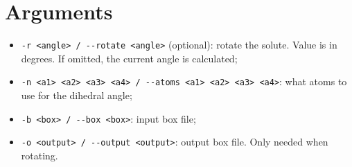 \section{Arguments}
\begin{itemize}
	\item \verb|-r <angle> / --rotate <angle>| (optional): rotate the solute. 
	Value is in degrees. If omitted, the current angle is calculated;
	\item \verb|-n <a1> <a2> <a3> <a4> / --atoms <a1> <a2> <a3> <a4>|: what 
	atoms to use for the dihedral angle;
	\item \verb|-b <box> / --box <box>|: input box file;
	\item \verb|-o <output> / --output <output>|: output box file. Only needed 
	when rotating.
\end{itemize}